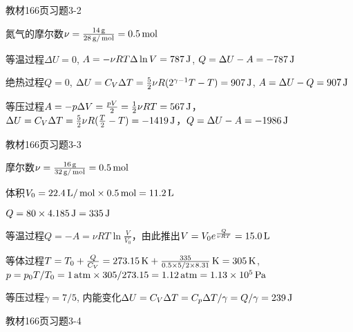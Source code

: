 \documentclass[CJK]{beamer}
\begin{document}
\begin{frame}
  \bch
  教材166页习题3-2
  
  \ech
\end{frame}


\begin{frame}
  \bch
  {\small
  氮气的摩尔数$\nu = \frac{14\,\mathrm{g}}{28\,\mathrm{g}/\,\mathrm{mol}} = 0.5\,\mathrm{mol}$
  \bitem
\item{等温过程$\Delta U = 0$, $A = -\nu R T\Delta \ln V = 787\,\mathrm{J}$, $Q = \Delta U - A = - 787\,\mathrm{J}$
}
\item{绝热过程$Q=0$, $\Delta U = C_V \Delta T = \frac{5}{2}\nu R (2^{\gamma-1}T -T) = 907\,\mathrm{J}$, $A = \Delta U - Q = 907\,\mathrm{J}$}
\item{等压过程$A = -p\Delta V = \frac{pV}{2} = \frac{1}{2}\nu R T = 567\,\mathrm{J}$，$\Delta U = C_V \Delta T = \frac{5}{2}\nu R (\frac{T}{2}-T) = -1419\,\mathrm{J}$，$Q = \Delta U - A = -1986 \,\mathrm{J}$}
  \eitem
  }
  \ech
\end{frame}

\begin{frame}
  \bch
  教材166页习题3-3
  \ech
\end{frame}

\begin{frame}
  \bch
  摩尔数$\nu = \frac{16\,\mathrm{g}}{32\,\mathrm{g}/\,\mathrm{mol}} = 0.5\,\mathrm{mol}$
  
  体积$V_0 = 22.4\,\mathrm{L}/\,\mathrm{mol} \times 0.5\,\mathrm{mol} = 11.2\,\mathrm{L}$

  $Q = 80\times 4.185 \,\mathrm{J} = 335\,\mathrm{J}$
  \bitem
\item{等温过程$Q = -A = \nu RT \ln\frac{V}{V_0}$，由此推出$V = V_0e^{\frac{Q}{\nu RT}} = 15.0\,\mathrm{L}$}
\item{等体过程$T = T_0+ \frac{Q}{C_V} = 273.15\,\mathrm{K} + \frac{335}{0.5\times 5/2\times 8.31}\,\mathrm{K} = 305\,\mathrm{K}$, $p = p_0 T/T_0 = 1\,\mathrm{atm} \times 305/273.15 = 1.12 \,\mathrm{atm} = 1.13\times 10^5\,\mathrm{Pa}$}
\item{等压过程$\gamma = 7/5$, 内能变化$\Delta U = C_V\Delta T = C_p\Delta T /\gamma = Q/\gamma = 239\,\mathrm{J}$}
  \eitem
  
  \ech
\end{frame}

\begin{frame}
  \bch
  教材166页习题3-4
  \ech
\end{frame}
\end{document}
